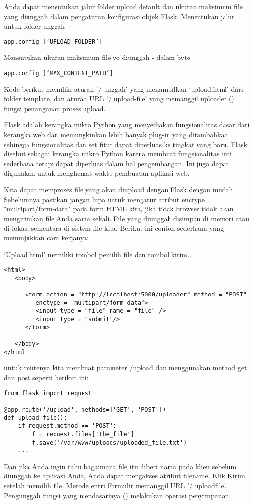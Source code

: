 \documentclass[12pt,a4paper]{article}
\begin{document}
Anda dapat menentukan jalur folder upload default dan ukuran maksimum file yang diunggah dalam pengaturan konfigurasi objek Flask.
Menentukan jalur untuk folder unggah
\begin{verbatim}
app.config [‘UPLOAD_FOLDER’] 
\end{verbatim}
Menentukan ukuran maksimum file yo diunggah - dalam byte
\begin{verbatim}
app.config [‘MAX_CONTENT_PATH’] 
\end{verbatim}
Kode berikut memiliki aturan ‘/ unggah’ yang menampilkan ‘upload.html’ dari folder template, dan aturan URL ‘/ upload-file’ yang memanggil uploader () fungsi penanganan proses upload.

Flask adalah kerangka mikro Python yang menyediakan fungsionalitas dasar dari kerangka web dan memungkinkan lebih banyak plug-in yang ditambahkan sehingga fungsionalitas dan set fitur dapat diperluas ke tingkat yang baru. Flask disebut sebagai kerangka mikro Python karena membuat fungsionalitas inti sederhana tetapi dapat diperluas dalam hal pengembangan. Ini juga dapat digunakan untuk menghemat waktu pembuatan aplikasi web.

Kita dapat memproses file yang akan diupload dengan Flask dengan mudah. Sebelumnya pastikan jangan lupa untuk mengatur atribut enctype = "multipart/form-data" pada form HTML kita, jika tidak browser tidak akan mengirimkan file Anda sama sekali. File yang diunggah disimpan di memori atau di lokasi sementara di sistem file kita. Berikut ini contoh sederhana yang menunjukkan cara kerjanya:

‘Upload.html’ memiliki tombol pemilih file dan tombol kirim..
\begin{verbatim}
<html>
   <body>
   
      <form action = "http://localhost:5000/uploader" method = "POST" 
         enctype = "multipart/form-data">
         <input type = "file" name = "file" />
         <input type = "submit"/>
      </form>
      
   </body>
</html
\end{verbatim}
untuk routenya kita membuat parameter /upload dan menggunakan method get dan post seperti berikut ini:

\begin{verbatim}
from flask import request

@app.route('/upload', methods=['GET', 'POST'])
def upload_file():
    if request.method == 'POST':
        f = request.files['the_file']
        f.save('/var/www/uploads/uploaded_file.txt')
    ...
\end{verbatim}
Dan jika Anda ingin tahu bagaimana file itu diberi nama pada klien sebelum diunggah ke aplikasi Anda, Anda dapat mengakses atribut filename.
Klik Kirim setelah memilih file. Metode entri Formulir memanggil URL '/ uploadfile'. Pengunggah fungsi yang mendasarinya () melakukan operasi penyimpanan.
\end{document}
